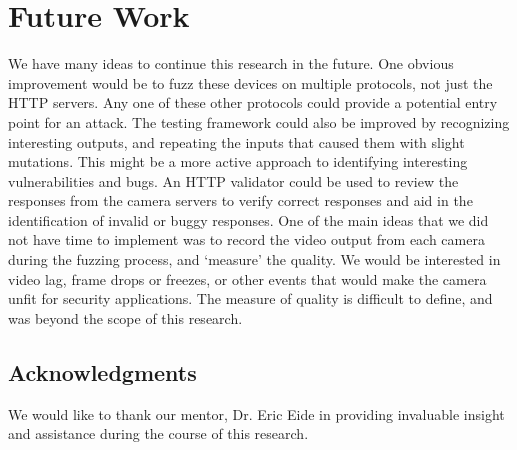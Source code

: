 \documentclass[letterpaper,twocolumn,10pt]{article}
\begin{document}
\section{Future Work}
We have many ideas to continue this research in the future. One obvious improvement would be to fuzz these devices on multiple protocols, not just the HTTP servers. Any one of these other protocols could provide a potential entry point for an attack. The testing framework could also be improved by recognizing interesting outputs, and repeating the inputs that caused them with slight mutations. This might be a more active approach to identifying interesting vulnerabilities and bugs. An HTTP validator could be used to review the responses from the camera servers to verify correct responses and aid in the identification of invalid or buggy responses. 
\newline
\newline
\newline
\newline
\newline
\newline
\newline
\newline
\newline
\newline
\newline
\newline
\newline
\newline
\newline
\newline
\newline
\newline
\newline
\newline
\newline
\newline
\newline
\newline
\newline
One of the main ideas that we did not have time to implement was to record the video output from each camera during the fuzzing process, and `measure' the quality. We would be interested in video lag, frame drops or freezes, or other events that would make the camera unfit for security applications. The measure of quality is difficult to define, and was beyond the scope of this research. 






\subsection*{Acknowledgments}
We would like to thank our mentor, Dr. Eric Eide in providing invaluable insight and assistance during the course of this research.

{\footnotesize 
}
\end{document}
